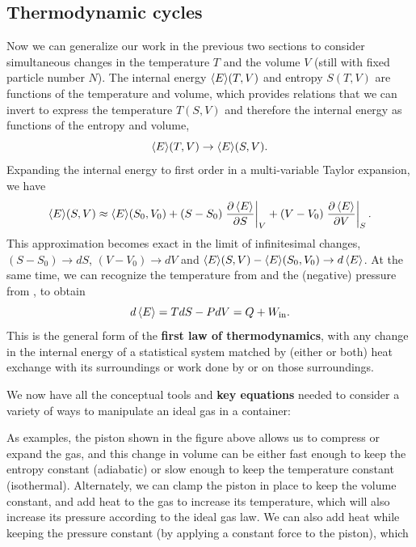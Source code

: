 \subsection{Thermodynamic cycles}
Now we can generalize our work in the previous two sections to consider simultaneous changes in the temperature $T$ and the volume $V$ (still with fixed particle number $N$).
The internal energy $\left\langle E \right\rangle\!(T, V)$ and entropy $S(T, V)$ are functions of the temperature and volume, which provides relations that we can invert to express the temperature $T(S, V)$ and therefore the internal energy as functions of the entropy and volume,
\begin{equation*}
  \left\langle E \right\rangle\!(T, V) \to \left\langle E \right\rangle\!(S, V).
\end{equation*}
Expanding the internal energy to first order in a multi-variable Taylor expansion, we have
\begin{equation*}
  \left\langle E \right\rangle\!(S, V) \approx \left\langle E \right\rangle\!(S_0, V_0) + (S - S_0) \left.\frac{\partial \left\langle E \right\rangle}{\partial S}\right|_V + (V - V_0) \left.\frac{\partial \left\langle E \right\rangle}{\partial V}\right|_S.
\end{equation*}
This approximation becomes exact in the limit of infinitesimal changes, $(S - S_0) \to dS$, $(V - V_0) \to dV$ and $\left\langle E \right\rangle\!(S, V) - \left\langle E \right\rangle\!(S_0, V_0) \to d\left\langle E \right\rangle$.
At the same time, we can recognize the temperature from  and the (negative) pressure from , to obtain
\begin{equation}
  d\left\langle E \right\rangle = T dS - P dV = Q + W_{\text{in}}.
\end{equation}
This is the general form of the \textbf{first law of thermodynamics}, with any change in the internal energy of a statistical system matched by (either or both) heat exchange with its surroundings or work done by or on those surroundings.

\begin{shaded}
  We now have all the conceptual tools and \textbf{key equations} needed to consider a variety of ways to manipulate an ideal gas in a container: \\
\end{shaded}

As examples, the piston shown in the figure above allows us to compress or expand the gas, and this change in volume can be either fast enough to keep the entropy constant (adiabatic) or slow enough to keep the temperature constant (isothermal).
Alternately, we can clamp the piston in place to keep the volume constant, and add heat to the gas to increase its temperature, which will also increase its pressure according to the ideal gas law.
We can also add heat while keeping the pressure constant (by applying a constant force to the piston), which 

